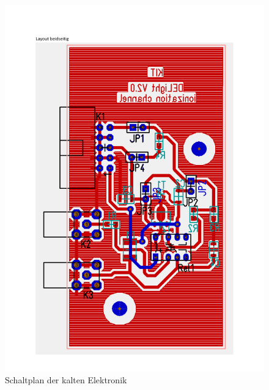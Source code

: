 \begin{figure}[!b]
\begin{center}
\includegraphics[page=6,width=\textwidth]{./fig/SchaltplanLayoutV2.pdf}
\vspace{-0.5cm}
\caption{Schaltplan der kalten Elektronik}
\label{fig:Schaltplan}
\end{center}
\end{figure}